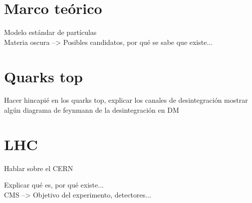 


\section{Marco teórico}



Modelo estándar de partículas \\

Materia oscura --> Posibles candidatos, por qué se sabe que existe...

\section{Quarks top}

Hacer hincapié en los quarks top, explicar los canales de desintegración mostrar algún diagrama de feynmann de la desintegración en DM

\section{LHC}

Hablar sobre el CERN

Explicar qué es, por qué existe...\\

CMS --> Objetivo del experimento, detectores...


